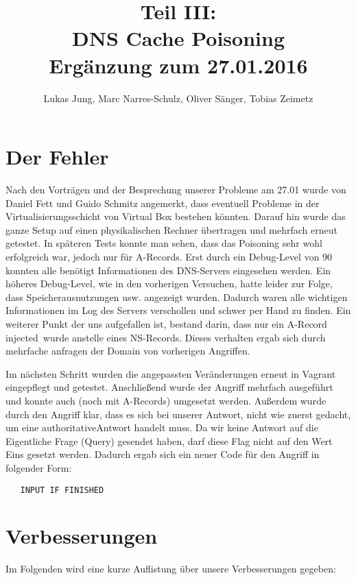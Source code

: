 \documentclass[10pt,a4paper]{article}
\author{Lukas Jung, Marc Narres-Schulz, Oliver Sänger, Tobias Zeimetz}
\title{Teil III: \\DNS Cache Poisoning \\Ergänzung zum 27.01.2016}
\begin{document}
\maketitle
\newpage

\section{Der Fehler}
Nach den Vorträgen und der Besprechung unserer Probleme am 27.01 wurde von Daniel Fett und Guido Schmitz angemerkt, dass eventuell Probleme in der Virtualisierungsschicht von Virtual Box bestehen könnten. Darauf hin wurde das ganze Setup auf einen physikalischen Rechner übertragen und mehrfach erneut getestet. In späteren Tests konnte man sehen, dass das Poisoning sehr wohl erfolgreich war, jedoch nur für A-Records. Erst durch ein Debug-Level von 90 konnten alle benötigt Informationen des DNS-Servers eingesehen werden. Ein höheres Debug-Level, wie in den vorherigen Versuchen, hatte leider zur Folge, dass Speicherausnutzungen usw. angezeigt wurden. Dadurch waren alle wichtigen Informationen im Log des Servers verschollen und schwer per Hand zu finden. Ein weiterer Punkt der uns aufgefallen ist, bestand darin, dass nur ein A-Record \glqq injected\grqq\ wurde anstelle eines NS-Records. Dieses verhalten ergab sich durch mehrfache anfragen der Domain von vorherigen Angriffen. 

Im nächsten Schritt wurden die angepassten Veränderungen erneut in Vagrant eingepflegt und getestet. Anschließend wurde der Angriff mehrfach ausgeführt und konnte auch (noch mit A-Records) umgesetzt werden. Außerdem wurde durch den Angriff klar, dass es sich bei unserer Antwort, nicht wie zuerst gedacht, um eine \glqq authoritative\grqq Antwort handelt muss. Da wir keine Antwort auf die Eigentliche Frage (Query) gesendet haben, darf diese Flag nicht auf den Wert Eins gesetzt werden. Dadurch ergab sich ein neuer Code für den Angriff in folgender Form:
\begin{center}
\begin{lstlisting}
   INPUT IF FINISHED
\end{lstlisting}
\end{center}

\section{Verbesserungen}
Im Folgenden wird eine kurze Auflistung über unsere Verbesserungen gegeben:
\end{document}

